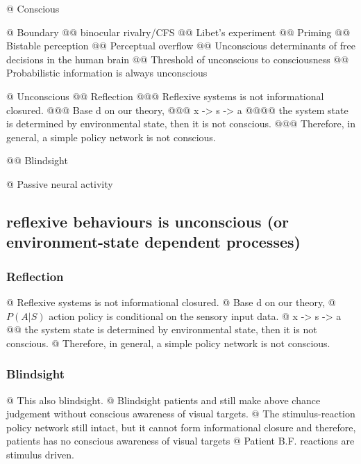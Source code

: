 \documentclass[utf8]{article}
\newenvironment{ants}
			{
			 \begin{easylist}[itemize]
		 	}
			{
			\end{easylist}
			} %
\begin{document}
		\begin{ants}
		    @ Conscious
		    
		    @ Boundary 
    		    @@ binocular rivalry/CFS
    		    @@ Libet's experiment
    		    @@ Priming
    		    @@ Bistable perception
    		    @@ Perceptual overflow
    		    @@ Unconscious determinants of free decisions in the human brain
    		    @@ Threshold of unconscious to consciousness
    		    @@ Probabilistic information is always unconscious
    		    
		    @ Unconscious 
                @@ Reflection
        			@@@ Reflexive systems is not informational closured.
        			@@@ Base	d on our theory,
        			@@@ x -> s -> a
        			@@@@ the system state is determined by environmental state, then it is not conscious.
        			@@@ Therefore, in general, a simple policy network is not conscious.
        			
        			
    			@@ Blindsight
    			
    			@ Passive neural activity
    			
		\end{ants}
		    
		\subsection{reflexive behaviours is unconscious (or environment-state dependent processes)}\label{sec:reflexive}
		\subsubsection{Reflection}
		\begin{ants}
			@ Reflexive systems is not informational closured.
			@ Base	d on our theory,
			@ $P(A|S)$ action policy is conditional on the sensory input data.
			@ x -> s -> a
			@@ the system state is determined by environmental state, then it is not conscious.
			@ Therefore, in general, a simple policy network is not conscious.
		\end{ants}

		\subsubsection{Blindsight}
		\begin{ants}
			@ This also blindsight.
			@ Blindsight patients and still make above chance judgement without conscious awareness of visual targets.
			@ The stimulus-reaction policy network still intact, but it cannot form informational closure and therefore, patients has no conscious awareness of visual  targets
			@ Patient B.F. reactions are stimulus driven.
		\end{ants}
\end{document}
